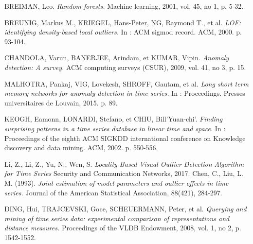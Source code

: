 

\begin{thebibliography}{1}
BREIMAN, Leo. 
\emph{Random forests.}
Machine learning, 2001, vol. 45, no 1, p. 5-32.

	 BREUNIG, Markus M., KRIEGEL, Hans-Peter, NG, Raymond T., et al. 
	 \emph{LOF: identifying density-based local outliers.} 
	 In : ACM sigmod record. ACM, 2000. p. 93-104.
	  
	  CHANDOLA, Varun, BANERJEE, Arindam, et KUMAR, Vipin. 
	  \emph{Anomaly detection: A survey.}
	   ACM computing surveys (CSUR), 2009, vol. 41, no 3, p. 15.
	   
	MALHOTRA, Pankaj, VIG, Lovekesh, SHROFF, Gautam, et al.
	\emph{Long short term memory networks for anomaly detection in time series.} 
	In : Proceedings. Presses universitaires de Louvain, 2015. p. 89.
	   
   KEOGH, Eamonn, LONARDI, Stefano, et CHIU, Bill'Yuan-chi'. 
   \emph{Finding surprising patterns in a time series database in linear time and space.} In : Proceedings of the eighth ACM SIGKDD international conference on Knowledge discovery and data mining. ACM, 2002. p. 550-556.
	   
Li, Z., Li, Z., Yu, N., Wen, S. 	   
	   \emph{Locality-Based Visual Outlier Detection Algorithm for Time Series}
	   Security and Communication Networks, 2017.  
	Chen, C., Liu, L. M. (1993).
\emph{Joint estimation of model parameters and outlier effects in time series.}
Journal of the American Statistical Association, 88(421), 284-297.	   

DING, Hui, TRAJCEVSKI, Goce, SCHEUERMANN, Peter, et al. 
\emph{Querying and mining of time series data: experimental comparison of representations and distance measures.}
 Proceedings of the VLDB Endowment, 2008, vol. 1, no 2, p. 1542-1552.	
	

	
	   
\end{thebibliography}

